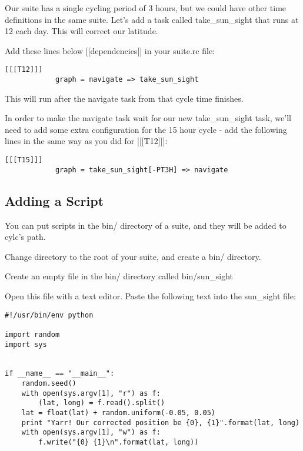 Our suite has a single cycling period of 3 hours, but we could have other time definitions in the same suite. Let's add a task called take\_sun\_sight that runs at 12 each day. This will correct our latitude.

Add these lines below [[dependencies]] in your suite.rc file:

\lstset{language=suiterc}
\begin{lstlisting}[columns=fullflexible]
        [[[T12]]]
            graph = navigate => take_sun_sight
\end{lstlisting}

This will run after the navigate task from that cycle time finishes.

In order to make the navigate task wait for our new take\_sun\_sight task, we'll need to add some extra configuration for the 15 hour cycle - add the following lines in the same way as you did for [[[T12]]]:

\lstset{language=suiterc}
\begin{lstlisting}[columns=fullflexible]
        [[[T15]]]
            graph = take_sun_sight[-PT3H] => navigate
\end{lstlisting}


\subsection{Adding a Script}

You can put scripts in the bin/ directory of a suite, and they will be added to cylc's path.

Change directory to the root of your suite, and create a bin/ directory.

Create an empty file in the bin/ directory called bin/sun\_sight

Open this file with a text editor. Paste the following text into the sun\_sight file:

\lstset{language=Python}
\begin{lstlisting}[columns=fullflexible]
#!/usr/bin/env python

import random
import sys


if __name__ == "__main__":
    random.seed()
    with open(sys.argv[1], "r") as f:
        (lat, long) = f.read().split()
    lat = float(lat) + random.uniform(-0.05, 0.05)
    print "Yarr! Our corrected position be {0}, {1}".format(lat, long)
    with open(sys.argv[1], "w") as f:
        f.write("{0} {1}\n".format(lat, long))
\end{lstlisting}

